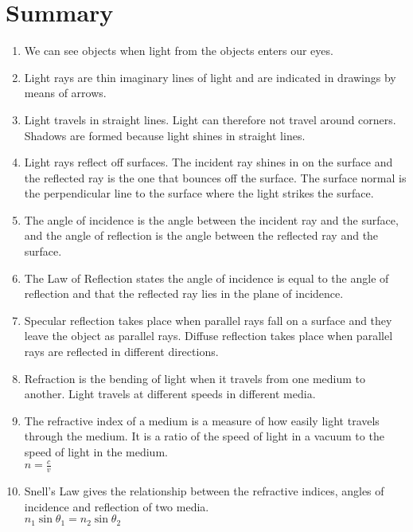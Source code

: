 \section{Summary}

\begin{enumerate}

\item We can see objects when light from the objects enters our eyes.

\item Light rays are thin imaginary lines of light and are indicated in drawings by means of arrows.

\item Light travels in straight lines. Light can therefore not travel around corners. Shadows are formed because light shines in straight lines.

\item Light rays reflect off surfaces. The incident ray shines in on the surface and the reflected ray is the one that bounces off the surface. The surface normal is the perpendicular line to the surface where the light strikes the surface.

\item The angle of incidence is the angle between the incident ray and the surface, and the angle of reflection is the angle between the reflected ray and the surface.

\item The Law of Reflection states the angle of incidence is equal to the angle of reflection and that the reflected ray lies in the plane of incidence.

\item Specular reflection takes place when parallel rays fall on a surface and they leave the object as parallel rays. Diffuse reflection takes place when parallel rays are reflected in different directions.

\item Refraction is the bending of light when it travels from one medium to another. Light travels at different speeds in different media.

\item The refractive index of a medium is a measure of how easily light travels through the medium. It is a ratio of the speed of light in a vacuum to the speed of light in the medium. \\$n = \frac{c}{v}$

\item Snell's Law gives the relationship between the refractive indices, angles of incidence and reflection of two media. \\$n_1 \sin \theta_1 = n_2 \sin \theta_2$


\end{enumerate}
